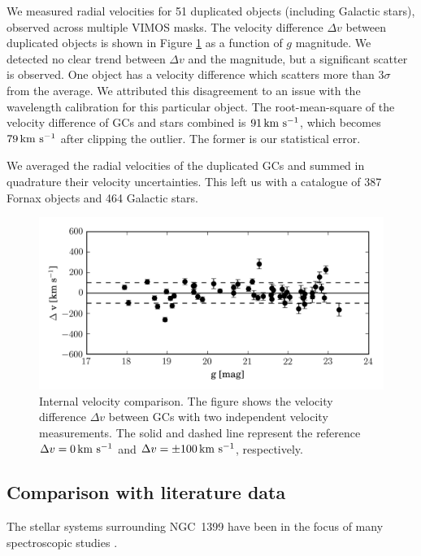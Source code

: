 \documentclass[useAMS,usenatbib]{mn2e}
\newcommand{\kms}{\mbox{\,km~s$^{-1}$}}
\begin{document}
We measured radial velocities for 51 duplicated objects (including Galactic 
stars), observed across multiple VIMOS masks. The velocity difference $\Delta 
v$ between duplicated objects is shown in Figure \ref{fig:internal} as a 
function of $g$ magnitude. We detected no clear trend between $\Delta v$ and 
the magnitude, but a significant scatter is observed. One object has a velocity 
difference which scatters more than 
3$\sigma$ from the average. We attributed this disagreement to an issue with 
the wavelength calibration for this particular object. The root-mean-square of 
the velocity difference of GCs and stars combined is $91 \kms$, which becomes 
$79\kms$ after clipping the outlier. The former is our statistical error.

We averaged the radial velocities of the duplicated GCs and summed in 
quadrature their velocity uncertainties. This left us with a catalogue of 387 
Fornax objects and 464 Galactic stars.

\begin{figure}
\centering
\includegraphics[width=\columnwidth]{figures/internal.png} 
\caption{Internal velocity comparison. The figure shows the velocity difference 
$\Delta v$ between GCs with two independent velocity measurements. The solid 
and dashed line represent the reference $\Delta v = 0 \kms$ and 
$\Delta v = \pm 100 \kms$, respectively. }
\label{fig:internal}
\end{figure}

\subsection{Comparison with literature data}\label{sec:compar}

The stellar systems surrounding NGC~1399 have been in the focus of many 
spectroscopic studies
\citep{Dirsch04, Schuberth, Bergond07, Firth07, Chilingarian11, Mieske04, 
Hilker07, Francis12, Drinkwater00}.
\end{document}
